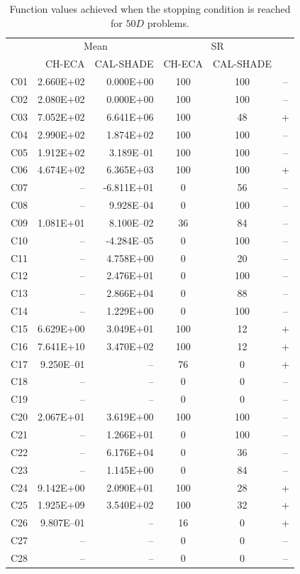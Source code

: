 \documentclass[conference]{IEEEtran}
\begin{document}
% 
% 
% 
\begin{table}[!ht]
	\caption{Function values achieved when the stopping condition is reached for $50D$ problems.}
	\centering
	\begin{tabular}{|c|r|r|c|c|c|}
	 \hline
	 &\multicolumn{2}{|c|}{Mean} & \multicolumn{2}{|c|}{SR} & \\
	\cline{2-5}
	 & CH-ECA & CAL-SHADE & CH-ECA & CAL-SHADE & \\ \hline

C01 & 2.660E+02 & 0.000E+00 &  100 &  100 & -- \\ 
C02 & 2.080E+02 & 0.000E+00 &  100 &  100 & -- \\ 
C03 & 7.052E+02 & 6.641E+06 &  100 &   48 & + \\ 
C04 & 2.990E+02 & 1.874E+02 &  100 &  100 & -- \\ 
C05 & 1.912E+02 & 3.189E--01 &  100 &  100 & -- \\ 
C06 & 4.674E+02 & 6.365E+03 &  100 &  100 & + \\ 
C07 &  -- & -6.811E+01 &    0 &   56 & -- \\ 
C08 &  -- & 9.928E--04 &    0 &  100 & -- \\ 
C09 & 1.081E+01 & 8.100E--02 &   36 &   84 & -- \\ 
C10 &  -- & -4.284E--05 &    0 &  100 & -- \\ 
C11 &  -- & 4.758E+00 &    0 &   20 & -- \\ 
C12 &  -- & 2.476E+01 &    0 &  100 & -- \\ 
C13 &  -- & 2.866E+04 &    0 &   88 & -- \\ 
C14 &  -- & 1.229E+00 &    0 &  100 & -- \\ 
C15 & 6.629E+00 & 3.049E+01 &  100 &   12 & + \\ 
C16 & 7.641E+10 & 3.470E+02 &  100 &   12 & + \\ 
C17 & 9.250E--01 &  -- &   76 &    0 & + \\ 
C18 &  -- &  -- &    0 &    0 & -- \\ 
C19 &  -- &  -- &    0 &    0 & -- \\ 
C20 & 2.067E+01 & 3.619E+00 &  100 &  100 & -- \\ 
C21 &  -- & 1.266E+01 &    0 &  100 & -- \\ 
C22 &  -- & 6.176E+04 &    0 &   36 & -- \\ 
C23 &  -- & 1.145E+00 &    0 &   84 & -- \\ 
C24 & 9.142E+00 & 2.090E+01 &  100 &   28 & + \\ 
C25 & 1.925E+09 & 3.540E+02 &  100 &   32 & + \\ 
C26 & 9.807E--01 &  -- &   16 &    0 & + \\ 
C27 &  -- &  -- &    0 &    0 & -- \\ 
C28 &  -- &  -- &    0 &    0 & -- \\ 
   \hline
	\end{tabular}
	\label{tab:d50c}
\end{table}
\end{document}
